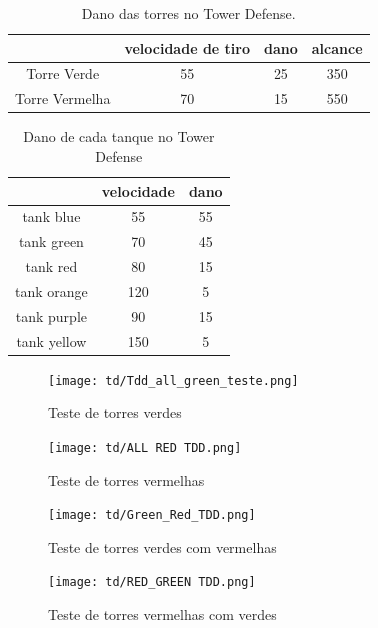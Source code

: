 \begin{table}
\caption{Dano das torres no Tower Defense.\label{tab:dados_torres2}}
\begin{tabular}{c|ccc}

             & velocidade de tiro  & dano & alcance\\ \hline
Torre Verde   & 55     & 25     &  350 \\
Torre Vermelha     & 70     & 15     &  550       

\end{tabular}
\end{table}


\begin{table}
\caption{Dano de cada tanque no Tower Defense}
\begin{tabular}{c|cc}
            & velocidade & dano   \\ \hline
tank blue   & 55    & 55         \\
tank green  & 70    & 45         \\
tank red    & 80    & 15          \\
tank orange & 120   & 5           \\
tank purple & 90    & 15          \\
tank yellow & 150   & 5           
\end{tabular}
\label{tab:tank-dmg2}
\end{table}

\pagebreak

\begin{figure}
  \centering
  \texttt{[image: td/Tdd\_all\_green\_teste.png]}
  \caption{Teste de torres verdes\label{fig:td-teste-all-green}}
\end{figure}

\begin{figure}
  \centering
  \texttt{[image: td/ALL RED TDD.png]}
  \caption{Teste de torres vermelhas\label{fig:tdd-teste-all-red}}
\end{figure}

\begin{figure}
  \centering
  \texttt{[image: td/Green\_Red\_TDD.png]}
  \caption{Teste de torres verdes com vermelhas\label{fig:tdd-teste-greenred}}
\end{figure}

\begin{figure}
  \centering
  \texttt{[image: td/RED\_GREEN TDD.png]}
  \caption{Teste de torres vermelhas com verdes\label{fig:td-teste-red-green}}
\end{figure}

